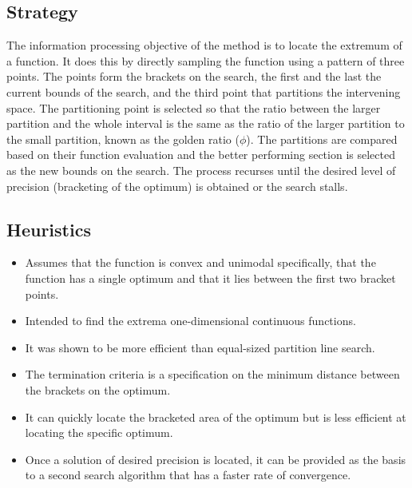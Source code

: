 \subsection{Strategy}
The information processing objective of the method is to locate the extremum of a function.
It does this by directly sampling the function using a pattern of three points. The points form the brackets on the search, the first and the last the current bounds of the search, and the third point that partitions the intervening space. The partitioning point is selected so that the ratio between the larger partition and the whole interval is the same as the ratio of the larger partition to the small partition, known as the golden ratio ($\phi$). The partitions are compared based on their function evaluation and the better performing section is selected as the new bounds on the search. The process recurses until the desired level of precision (bracketing of the optimum) is obtained or the search stalls.

\subsection{Heuristics}

\begin{itemize}
	\item Assumes that the function is convex and unimodal specifically, that the function has a single optimum and that it lies between the first two bracket points.
	\item Intended to find the extrema one-dimensional continuous functions.
	\item It was shown to be more efficient than equal-sized partition line search.
	\item The termination criteria is a specification on the minimum distance between the brackets on the optimum.
	\item It can quickly locate the bracketed area of the optimum but is less efficient at locating the specific optimum.
	\item Once a solution of desired precision is located, it can be provided as the basis to a second search algorithm that has a faster rate of convergence.
\end{itemize}

